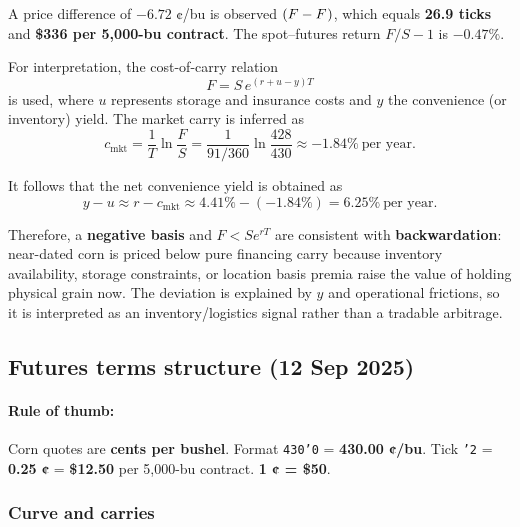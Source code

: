 \documentclass[11pt,a4paper]{article} %
\begin{document}
A price difference of $\mathbf{-6.72}$ ¢/bu is observed $(F-F^{\*})$, which equals \textbf{26.9 ticks} and \textbf{\$336 per 5,000-bu contract}. The spot–futures return $F/S-1$ is $\mathbf{-0.47\%}$.

For interpretation, the cost-of-carry relation
\[
F=S\,e^{(r+u-y)T}
\]
is used, where $u$ represents storage and insurance costs and $y$ the convenience (or inventory) yield. The market carry is inferred as
\[
c_{\text{mkt}}=\frac{1}{T}\ln\!\frac{F}{S}
=\frac{1}{91/360}\ln\!\frac{428}{430}\approx \mathbf{-1.84\%}\ \text{per year}.
\]

It follows that the net convenience yield is obtained as
\[
y-u \approx r-c_{\text{mkt}}\approx 4.41\%-(-1.84\%)=\mathbf{6.25\%}\ \text{per year}.
\]

Therefore, a \textbf{negative basis} and $F<S e^{rT}$ are consistent with \textbf{backwardation}: near-dated corn is priced below pure financing carry because inventory availability, storage constraints, or location basis premia raise the value of holding physical grain now. The deviation is explained by $y$ and operational frictions, so it is interpreted as an inventory/logistics signal rather than a tradable arbitrage.

\subsection{Futures terms structure (12 Sep 2025)}

\paragraph{Rule of thumb:} Corn quotes are \textbf{cents per bushel}. Format \texttt{430'0} = \textbf{430.00 ¢/bu}. Tick \texttt{'2} = \textbf{0.25 ¢} = \textbf{\$12.50} per 5,000-bu contract. \textbf{1 ¢ = \$50}.

\subsubsection*{Curve and carries}
\end{document}
